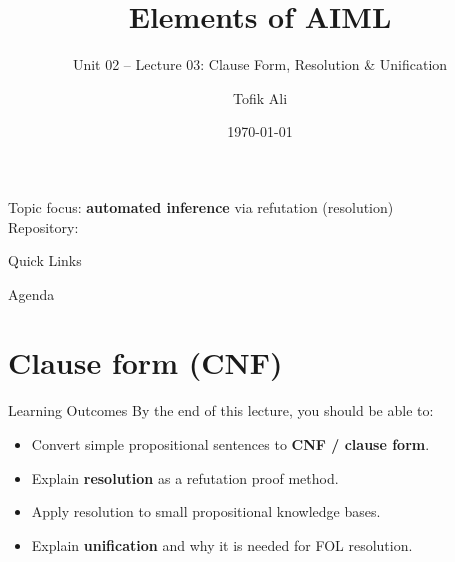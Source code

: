 \documentclass[aspectratio=169]{beamer}
\title[Elements of AIML]{Elements of AIML}
\subtitle{Unit 02 -- Lecture 03: Clause Form, Resolution \& Unification}
\author{Tofik Ali}
\institute{School of Computer Science, UPES Dehradun}
\date{\today}
\begin{document}
\UPESCoverFrame
\setcounter{framenumber}{0}

\begin{frame}
  \titlepage
  \vspace{0.3em}
  \begin{center}
    \footnotesize Topic focus: \textbf{automated inference} via refutation (resolution)\\[0.25em]
    \footnotesize Repository: \texttt{\AIMLRepoURL}
  \end{center}
  \slidesources{\AIMLUnitIISources}
\end{frame}

\begin{frame}{Quick Links}
  \centering
  \hyperlink{sec:cnf}{}\hspace{0.6em}
  \hyperlink{sec:respl}{}\hspace{0.6em}
  \hyperlink{sec:resfol}{}\hspace{0.6em}
  \hyperlink{sec:unif}{}\hspace{0.6em}
  \hyperlink{sec:summary}{}
\end{frame}

\begin{frame}{Agenda}
  \tableofcontents
\end{frame}

\section{Clause form (CNF)}
\label{sec:cnf}

\begin{frame}{Learning Outcomes}
  By the end of this lecture, you should be able to:
  \begin{itemize}[<+->]
    \item Convert simple propositional sentences to \textbf{CNF / clause form}.
    \item Explain \textbf{resolution} as a refutation proof method.
    \item Apply resolution to small propositional knowledge bases.
    \item Explain \textbf{unification} and why it is needed for FOL resolution.
  \end{itemize}
\end{frame}
\end{document}
